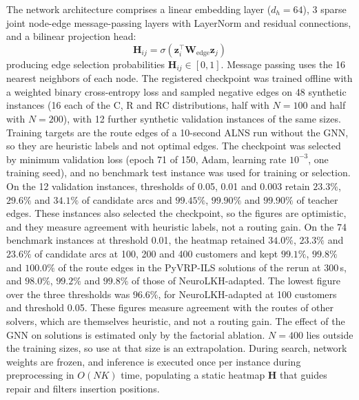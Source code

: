 \documentclass{ieeeaccess}
\begin{document}
The network architecture comprises a linear embedding layer ($d_h = 64$), 3 sparse joint node-edge message-passing layers with LayerNorm and residual connections, and a bilinear projection head:
\begin{equation}
  \mathbf{H}_{ij} = \sigma\left( \mathbf{z}_i^{\top} \mathbf{W}_{\text{edge}} \mathbf{z}_j \right)
  \label{eq:gnn_bilinear_head}
\end{equation}
producing edge selection probabilities $\mathbf{H}_{ij} \in [0, 1]$. Message passing uses the 16 nearest neighbors of each node. The registered checkpoint was trained offline with a weighted binary cross-entropy loss and sampled negative edges on 48 synthetic instances (16 each of the C, R and RC distributions, half with $N=100$ and half with $N=200$), with 12 further synthetic validation instances of the same sizes. Training targets are the route edges of a 10-second ALNS run without the GNN, so they are heuristic labels and not optimal edges. The checkpoint was selected by minimum validation loss (epoch 71 of 150, Adam, learning rate $10^{-3}$, one training seed), and no benchmark test instance was used for training or selection. On the 12 validation instances, thresholds of 0.05, 0.01 and 0.003 retain $23.3\%$, $29.6\%$ and $34.1\%$ of candidate arcs and $99.45\%$, $99.90\%$ and $99.90\%$ of teacher edges. These instances also selected the checkpoint, so the figures are optimistic, and they measure agreement with heuristic labels, not a routing gain. On the 74 benchmark instances at threshold 0.01, the heatmap retained $34.0\%$, $23.3\%$ and $23.6\%$ of candidate arcs at 100, 200 and 400 customers and kept $99.1\%$, $99.8\%$ and $100.0\%$ of the route edges in the PyVRP-ILS solutions of the rerun at 300\,s, and $98.0\%$, $99.2\%$ and $99.8\%$ of those of NeuroLKH-adapted. The lowest figure over the three thresholds was $96.6\%$, for NeuroLKH-adapted at 100 customers and threshold 0.05. These figures measure agreement with the routes of other solvers, which are themselves heuristic, and not a routing gain. The effect of the GNN on solutions is estimated only by the factorial ablation. $N=400$ lies outside the training sizes, so use at that size is an extrapolation. During search, network weights are frozen, and inference is executed once per instance during preprocessing in $O(N K)$ time, populating a static heatmap $\mathbf{H}$ that guides repair and filters insertion positions.
\end{document}
